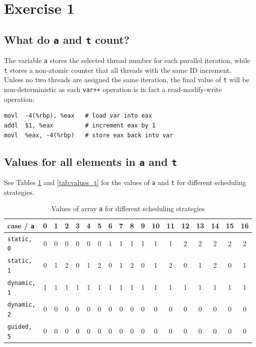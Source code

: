\documentclass[a4paper,%
7pt,%
DIV12,
headsepline,%
headings=normal,
]{scrartcl}
\begin{document}
\maketitlepage




\section{Exercise 1}



\subsection{What do \texttt{a} and \texttt{t} count?}

The variable \texttt{a} stores the selected thread number for each parallel iteration, while \texttt{t} stores a non-atomic counter that all threads with the same ID increment. Unless no two threads are assigned the same iteration, the final value of \texttt{t} will be non-deterministic as each \texttt{var++} operation is in fact a read-modify-write operation:

\begin{verbatim}
movl  -4(%rbp), %eax   # load var into eax
addl  $1, %eax         # increment eax by 1
movl  %eax, -4(%rbp)   # store eax back into var
\end{verbatim}

\subsection{Values for all elements in \texttt{a} and \texttt{t}}

See Tables \ref{tab:values_a} and \ref{tab:values_t} for the values of \texttt{a} and \texttt{t} for different scheduling strategies.

\begin{table}[htbp]
    \centering
    \caption{Values of array \texttt{a} for different scheduling strategies}
    \label{tab:values_a}
    \begin{tabular}{l*{17}{c}}
        \toprule
        case / \texttt{a} & 0 & 1 & 2 & 3 & 4 & 5 & 6 & 7 & 8 & 9 & 10 & 11 & 12 & 13 & 14 & 15 & 16 \\
        \midrule
        \texttt{static, 0} & 0 & 0 & 0 & 0 & 0 & 0 & 1 & 1 & 1 & 1 & 1 & 1 & 2 & 2 & 2 & 2 & 2 \\
        \texttt{static, 1} & 0 & 1 & 2 & 0 & 1 & 2 & 0 & 1 & 2 & 0 & 1 & 2 & 0 & 1 & 2 & 0 & 1 \\
        \texttt{dynamic, 1} & 1 & 1 & 1 & 1 & 1 & 1 & 1 & 1 & 1 & 1 & 1 & 1 & 1 & 1 & 1 & 1 & 1 \\
        \texttt{dynamic, 2} & 0 & 0 & 0 & 0 & 0 & 0 & 0 & 0 & 0 & 0 & 0 & 0 & 0 & 0 & 0 & 0 & 0 \\
        \texttt{guided, 5} & 0 & 0 & 0 & 0 & 0 & 0 & 0 & 0 & 0 & 0 & 0 & 0 & 0 & 0 & 0 & 0 & 0 \\
        \bottomrule
    \end{tabular}
\end{table}
\end{document}
